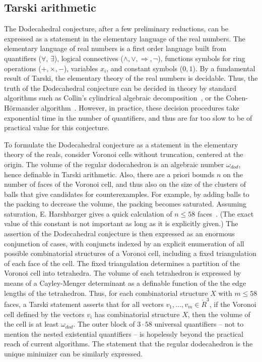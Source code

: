 \documentclass{article} %
\begin{document}
\subsection{Tarski arithmetic}


The Dodecahedral conjecture, after a few preliminary reductions, can
be expressed as a statement in the elementary language of the real
numbers. The elementary language of real numbers is a first order
language built from quantifiers ($\forall,\,\exists$), logical
connectives ($\land,\lor,\Rightarrow,\neg$), functions symbols for
ring operations ($+,\times,-$), variables $x_i$, and constant symbols
($0,1$). By a fundamental result of Tarski, the elementary theory of
the real numbers is decidable. Thus, the truth of the Dodecahedral
conjecture can be decided in theory by standard algorithms such as
Collin's cylindrical algebraic decomposition~\cite{Collins:1975:ATFL},
or the Cohen-H\"ormander algorithm~\cite{Hormander:1983:PDO}. However,
in practice, these decision procedures take exponential time in the
number of quantifiers, and thus are far too slow to be of practical
value for this conjecture.

To formulate the Dodecahedral conjecture as a statement in the
elementary theory of the reals, consider Voronoi cells without
truncation, centered at the origin. The volume of the regular
dodecahedron is an algebraic number $\omega_{dod}$, hence definable in
Tarski arithmetic. Also, there are a priori bounds $n$ on the number
of faces of the Voronoi cell, and thus also on the size of the
clusters of balls that give candidates for counterexamples. For
example, by adding balls to the packing to decrease the volume, the
packing becomes saturated. Assuming saturation, E. Harshbarger gives a
quick calculation of $n\le58$ faces~\cite{website:HarsbargerVoronoi}.
(The exact value of this constant is not important as long as it is
explicitly given.) The assertion of the Dodecahedral conjecture is
then expressed as an enormous conjunction of cases, with conjuncts
indexed by an explicit enumeration of all possible combinatorial
structures of a Voronoi cell, including a fixed triangulation of each
face of the cell. The fixed triangulation determines a partition of
the Voronoi cell into tetrahedra. The volume of each tetrahedron is
expressed by means of a Cayley-Menger determinant as a definable
function of the the edge lengths of the tetrahedron. Thus, for each
combinatorial structure $X$ with $m\le 58$ faces, a Tarski statement
asserts that for all vectors $v_1,\ldots,v_m\in\ring{R}^3$, if the
Voronoi cell defined by the vectors $v_i$ has combinatorial structure
$X$, then the volume of the cell is at least $\omega_{dod}$. The outer
block of $3\cdot 58$ universal quantifiers -- not to mention the
nested existential quantifiers -- is hopelessly beyond the practical
reach of current algorithms. The statement that the regular
dodecahedron is the unique minimizer can be similarly expressed.
\end{document}
